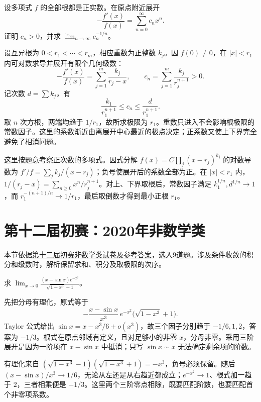 \documentclass[12pt,fontset=fandol]{ctexart}
\begin{document}
\begin{example}\label{nm-2019-5}
设多项式 $f$ 的全部根都是正实数。在原点附近展开
\[
 -\frac{f'(x)}{f(x)}=\sum_{n=0}^\infty c_nx^n.
\]
证明 $c_n>0$，并求 $\displaystyle\lim_{n\to\infty}c_n^{-1/n}$。
\end{example}
\begin{solve}
设互异根为 $0<r_1<\cdots<r_m$，相应重数为正整数 $k_j$。因 $f(0)\ne0$，在 $|x|<r_1$ 内可对数求导并展开有限个几何级数：
\[
 -\frac{f'(x)}{f(x)}=\sum_{j=1}^m\frac{k_j}{r_j-x},
 \qquad c_n=\sum_{j=1}^m\frac{k_j}{r_j^{n+1}}>0.
\]
记次数 $d=\sum k_j$，有
\[
 \frac{k_1}{r_1^{n+1}}\leq c_n\leq\frac d{r_1^{n+1}}.
\]
取 $n$ 次方根，两端均趋于 $1/r_1$，故所求极限为 $r_1$。重数只进入不会影响根极限的常数因子。这里的系数渐近由离展开中心最近的极点决定；正系数又使上下界完全避免了相消问题。

这里按题意考察正次数的多项式。因式分解 $f(x)=C\prod_j(x-r_j)^{k_j}$ 的对数导数为 $f'/f=\sum_jk_j/(x-r_j)$；负号使展开后的系数全部为正。在 $|x|<r_1$ 内，$1/(r_j-x)=\sum_{n\ge0}x^n/r_j^{n+1}$。对上、下界取根后，常数因子满足 $k_1^{1/n},d^{1/n}\to1$，而 $r_1^{-(n+1)/n}\to1/r_1$，最后取倒数才得到最小正根 $r_1$。

\end{solve}

\section{第十二届初赛：2020年非数学类}
本节依据\href{https://math.ecnu.edu.cn/llin/pdf_files/nonmathans2020.pdf}{第十二届初赛非数学类试卷及参考答案}，选入9道题。涉及条件收敛的积分和级数时，解析保留求和、积分及取极限的次序。

\begin{example}\label{nm-2020-1a}
求 $\displaystyle\lim_{x\to0}\frac{(x-\sin x)e^{-x^2}}{\sqrt{1-x^3}-1}$。
\end{example}
\begin{solve}
先把分母有理化，原式等于
\[
 -\frac{x-\sin x}{x^3}\,e^{-x^2}\bigl(\sqrt{1-x^3}+1\bigr).
\]
Taylor 公式给出 $\sin x=x-x^3/6+o(x^3)$，故三个因子分别趋于 $-1/6,1,2$，答案为 $-1/3$。根式在原点邻域有定义，且对足够小的非零 $x$，分母非零。采用三阶展开是因为一阶项在 $x-\sin x$ 中抵消；只写 $\sin x\sim x$ 无法确定剩余项的阶数。

有理化来自 $(\sqrt{1-x^3}-1)(\sqrt{1-x^3}+1)=-x^3$，负号必须保留。随后 $(x-\sin x)/x^3\to1/6$，无论从左还是从右趋近都成立；$e^{-x^2}\to1$、根式加一趋于 $2$，三者相乘便是 $-1/3$。这里两个三阶零点相除，既要匹配阶数，也要匹配首个非零项系数。

\end{solve}
\end{document}
